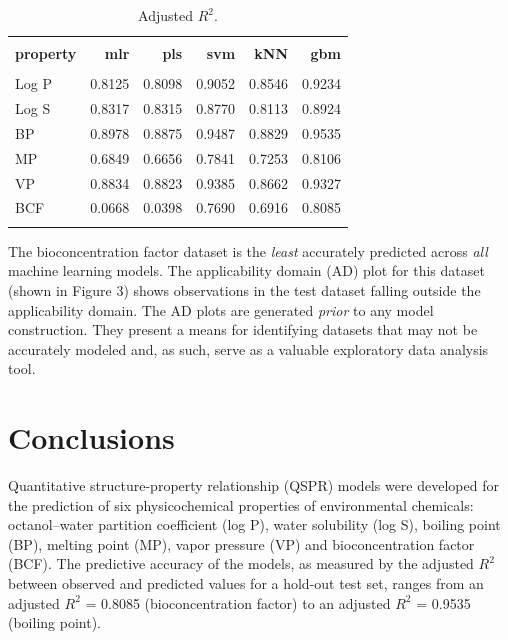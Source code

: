 \documentclass[10pt, letter]{article}
\renewcommand{\=}{\, =\, }
\newcommand{\+}{\, +\, }
\renewcommand{\-}{\, -\, }
\begin{document}
\begin{table}[H]
\begin{center}
\begin{tabular}{lrrrrr}
\toprule
&&\\
{\bf property} & {\bf mlr} & {\bf pls} &  {\bf svm}  & {\bf kNN}  & {\bf gbm}\\
\midrule
&&\\
Log P  &   0.8125 & 0.8098 & 0.9052 & 0.8546 & 0.9234\\
Log S  &   0.8317 & 0.8315 & 0.8770 & 0.8113 & 0.8924\\
BP  &   0.8978 & 0.8875 & 0.9487 & 0.8829 & 0.9535\\
MP  &   0.6849 & 0.6656 & 0.7841 & 0.7253 & 0.8106\\
VP  &   0.8834 & 0.8823 & 0.9385 & 0.8662 & 0.9327\\
BCF  &   0.0668 & 0.0398 & 0.7690 & 0.6916 & 0.8085\\
&&\\
\bottomrule
\end{tabular}
\end{center}
\caption{Adjusted \( R^2\).}
\end{table}

The bioconcentration factor dataset is the \textit{least} accurately predicted across \textit{all} machine learning models. The applicability domain (AD) plot for this dataset (shown in Figure 3) shows observations in the test dataset falling outside the applicability domain. The AD plots are generated \textit{prior} to any model construction. They present a means for identifying datasets that may not be accurately modeled and, as such, serve as a valuable exploratory data analysis tool.

\section{Conclusions}

Quantitative structure-property relationship (QSPR) models were developed for the
prediction of six physicochemical properties of environmental chemicals: octanol–water
partition coefficient (log P), water solubility (log S), boiling point (BP), melting point (MP),
vapor pressure (VP) and bioconcentration factor (BCF). The predictive accuracy of the models, as measured by the adjusted \( R^2\) between observed and predicted values for a hold-out test set, ranges from an adjusted \( R^2\) = 0.8085 (bioconcentration factor) to an adjusted \( R^2\) = 0.9535 (boiling point).
\end{document}
